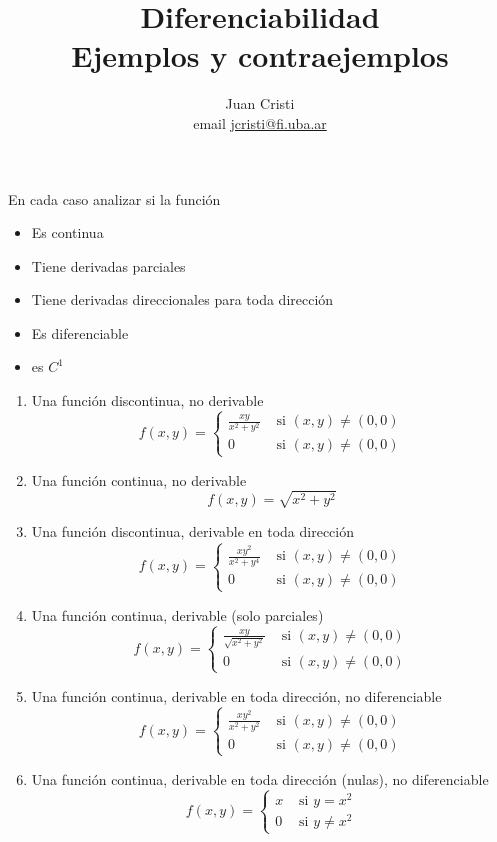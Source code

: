 \documentclass[12pt,a4paper]{article}
\author{Juan Cristi \\ email \href{mailto:jcristi@fi.uba.ar}{jcristi@fi.uba.ar}} %
\title{Diferenciabilidad\\ Ejemplos y contraejemplos}
\newcommand{\si}{\text{ si }}
\begin{document}
\maketitle

En cada caso analizar si la función
\begin{itemize}
	\item Es continua
	\item Tiene derivadas parciales
	\item Tiene derivadas direccionales para toda dirección
	\item Es diferenciable
	\item es $C^1$
\end{itemize}

\begin{enumerate}
    \item Una función discontinua, no derivable
    \[f(x,y)=\begin{cases}
    \frac{xy}{x^2+y^2} & \si (x,y)  \neq (0,0)\\
    0 & \si (x,y)  \neq (0,0)
    \end{cases}
    \]
    
    \item Una función continua, no derivable
    \[f(x,y)=\sqrt{x^2+y^2}\]
    
    \item Una función discontinua, derivable en toda dirección
    \[f(x,y)=\begin{cases}
    \frac{xy^2}{x^2+y^4} & \si (x,y)  \neq (0,0)\\
    0 & \si (x,y)  \neq (0,0)
    \end{cases}
    \]

    \item Una función continua, derivable (solo parciales)
    \[f(x,y)=\begin{cases}
    \frac{xy}{\sqrt{x^2+y^2}} & \si (x,y)  \neq (0,0)\\
    0 & \si (x,y)  \neq (0,0)
    \end{cases}
    \]
    
    \item Una función continua, derivable en toda dirección, no diferenciable
    \[f(x,y)=\begin{cases}
    \frac{xy^2}{x^2+y^2} & \si (x,y)  \neq (0,0)\\
    0 & \si (x,y)  \neq (0,0)
    \end{cases}
    \]
    
    \item Una función continua, derivable en toda dirección (nulas), no diferenciable
    \[f(x,y)=\begin{cases}
    x & \si y=x^2 \\
    0 & \si y\neq x^2
    \end{cases}
    \]
    

\end{enumerate}
\end{document}
